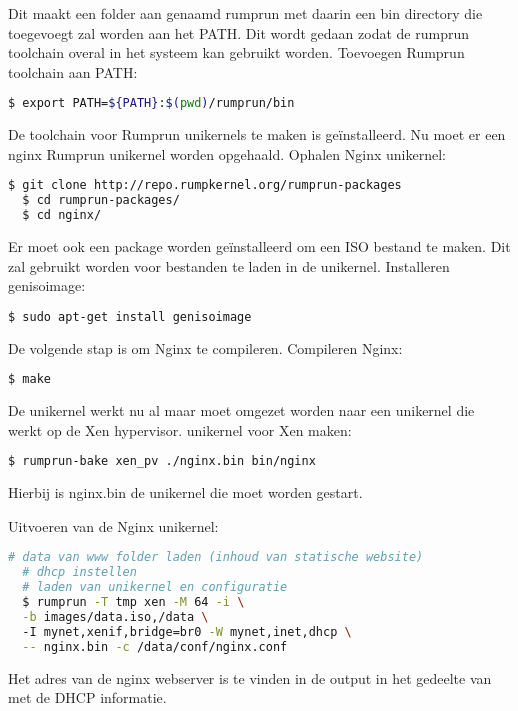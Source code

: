 Dit maakt een folder aan genaamd rumprun met daarin een bin directory die toegevoegt zal worden aan het PATH. Dit wordt gedaan zodat de rumprun toolchain overal in het systeem kan gebruikt worden.
\noindent Toevoegen Rumprun toolchain aan PATH:
\begin{lstlisting}[language=bash]
  $ export PATH=${PATH}:$(pwd)/rumprun/bin
\end{lstlisting}

De toolchain voor Rumprun unikernels te maken is geïnstalleerd. Nu moet er een nginx Rumprun unikernel worden opgehaald.
\noindent Ophalen Nginx unikernel:
\begin{lstlisting}[language=bash]
  $ git clone http://repo.rumpkernel.org/rumprun-packages
  $ cd rumprun-packages/
  $ cd nginx/
\end{lstlisting}

Er moet ook een package worden geïnstalleerd om een ISO bestand te maken. Dit zal gebruikt worden voor bestanden te laden in de unikernel.
\noindent Installeren genisoimage:
\begin{lstlisting}[language=bash]
  $ sudo apt-get install genisoimage
\end{lstlisting}

De volgende stap is om Nginx te compileren.
\noindent Compileren Nginx:
\begin{lstlisting}[language=bash]
  $ make
\end{lstlisting}

De unikernel werkt nu al maar moet omgezet worden naar een unikernel die werkt op de Xen hypervisor.
\noindent unikernel voor Xen maken:
\begin{lstlisting}[language=bash]
  $ rumprun-bake xen_pv ./nginx.bin bin/nginx
\end{lstlisting}

Hierbij is nginx.bin de unikernel die moet worden gestart.

\noindent Uitvoeren van de Nginx unikernel:
\begin{lstlisting}[language=bash]
  # data van www folder laden (inhoud van statische website)
  # dhcp instellen
  # laden van unikernel en configuratie
  $ rumprun -T tmp xen -M 64 -i \
  -b images/data.iso,/data \ 
  -I mynet,xenif,bridge=br0 -W mynet,inet,dhcp \
  -- nginx.bin -c /data/conf/nginx.conf 
\end{lstlisting}

Het adres van de nginx webserver is te vinden in de output in het gedeelte van met de DHCP informatie.

